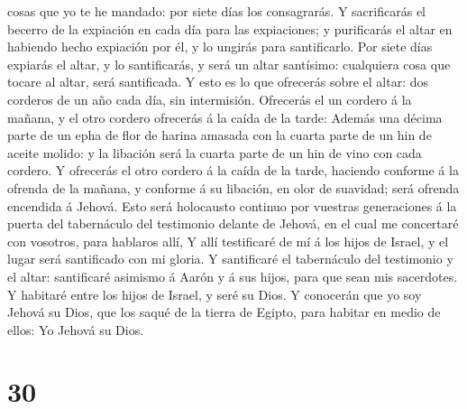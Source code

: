 cosas que yo te he mandado: por siete días los consagrarás.
 Y sacrificarás el becerro de la expiación en cada día para
las expiaciones; y purificarás el altar en habiendo hecho expiación por
él, y lo ungirás para santificarlo.  Por siete días
expiarás el altar, y lo santificarás, y será un altar santísimo:
cualquiera cosa que tocare al altar, será santificada.  Y
esto es lo que ofrecerás sobre el altar: dos corderos de un año cada
día, sin intermisión.  Ofrecerás el un cordero á la mañana,
y el otro cordero ofrecerás á la caída de la tarde:  Además
una décima parte de un epha de flor de harina amasada con la cuarta
parte de un hin de aceite molido: y la libación será la cuarta parte de
un hin de vino con cada cordero.  Y ofrecerás el otro
cordero á la caída de la tarde, haciendo conforme á la ofrenda de la
mañana, y conforme á su libación, en olor de suavidad; será ofrenda
encendida á Jehová.  Esto será holocausto continuo por
vuestras generaciones á la puerta del tabernáculo del testimonio delante
de Jehová, en el cual me concertaré con vosotros, para hablaros allí,
 Y allí testificaré de mí á los hijos de Israel, y el lugar
será santificado con mi gloria.  Y santificaré el
tabernáculo del testimonio y el altar: santificaré asimismo á Aarón y á
sus hijos, para que sean mis sacerdotes.  Y habitaré entre
los hijos de Israel, y seré su Dios.  Y conocerán que yo
soy Jehová su Dios, que los saqué de la tierra de Egipto, para habitar
en medio de ellos: Yo Jehová su Dios.

\hypertarget{section-29}{%
\section{30}\label{section-29}}

